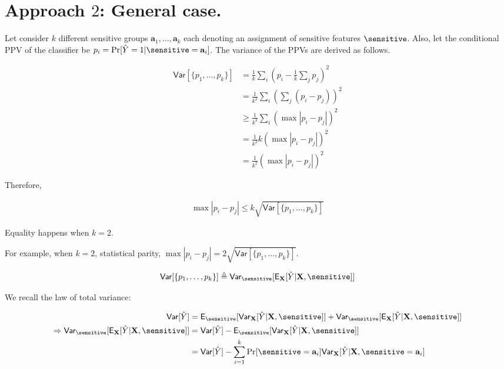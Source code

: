 \section{Approach $ 2 $: General case.}
Let consider $ k $ different sensitive groups $ \mathbf{a}_1, \dots, \mathbf{a}_k $ each denoting an assignment of sensitive features $ \sensitive $. Also, let the conditional PPV of the classifier be $ p_i = \Pr[\hat{Y}=1|\sensitive=\mathbf{a}_i] $. The variance of the PPVs are derived as follows. 

\begin{align*}
	\mathsf{Var}[\{p_1, \dots, p_k\}] 
	&= \frac{1}{k} \sum_i (p_i - \frac{1}{k}\sum_j p_j)^2 \\
	&= \frac{1}{k^3}\sum_i (\sum_j (p_i - p_j))^2 \\ 
	&\ge \frac{1}{k^3} \sum_i (\max |p_i - p_j|)^2 \\
	&= \frac{1}{k^3} k (\max |p_i - p_j|)^2 \\
	&= \frac{1}{k^2} (\max |p_i - p_j|)^2
\end{align*}

Therefore, 

\begin{align*}
	\max|p_i - p_j| \le k \sqrt{\mathsf{Var}[\{p_1, \dots, p_k\}] }
\end{align*}

Equality happens when $ k = 2 $. 


For example, when $ k  = 2 $, statistical parity, $ \max|p_i - p_j| = 2 \sqrt{\mathsf{Var}[\{p_1, \dots, p_k\}] } $. 



\[
\mathsf{Var}[\{p_1, \dots, p_k\}]  \triangleq \mathsf{Var}_\sensitive[\mathsf{E}_{\mathbf{X}}[\hat{Y}|\mathbf{X}, \sensitive]]
\]

We recall the law of total variance: 

\begin{align*}
	\mathsf{Var}[\hat{Y}] &= \mathsf{E}_\sensitive[\mathsf{Var}_{\mathbf{X}}[\hat{Y}|\mathbf{X}, \sensitive]] + \mathsf{Var}_\sensitive[\mathsf{E}_{\mathbf{X}}[\hat{Y}|\mathbf{X}, \sensitive]] \\
	\Rightarrow \mathsf{Var}_\sensitive[\mathsf{E}_{\mathbf{X}}[\hat{Y}|\mathbf{X}, \sensitive]] &= \mathsf{Var}[\hat{Y}] - \mathsf{E}_\sensitive[\mathsf{Var}_{\mathbf{X}}[\hat{Y}|\mathbf{X}, \sensitive]]\\
	&=\mathsf{Var}[\hat{Y}] - \sum_{i=1}^k \Pr[\sensitive=\mathbf{a}_i] \mathsf{Var}_{\mathbf{X}}[\hat{Y}|\mathbf{X}, \sensitive=\mathbf{a}_i]
\end{align*}

